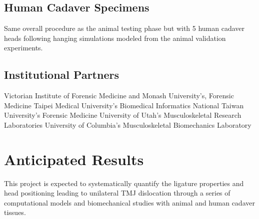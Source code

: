 \documentclass{article}
\begin{document}
%
\subsection{Human Cadaver Specimens} 

Same overall procedure as the animal testing phase but with 5 human cadaver heads following hanging simulations modeled from the animal validation experiments.

%
\subsection{Institutional Partners}

\begin{outline}



\1 Victorian Institute of Forensic Medicine and Monash University's, Forensic Medicine
\1 Taipei Medical University's Biomedical Informatics
\1 National Taiwan University's Forensic Medicine
\1 University of Utah’s Musculoskeletal Research Laboratories
\1 University of Columbia’s Musculoskeletal Biomechanics Laboratory


\end{outline}

%


\section{Anticipated Results}

This project is expected to systematically quantify the ligature properties and head positioning leading to unilateral TMJ dislocation through a series of computational models and biomechanical studies with animal and human cadaver tissues. 
\end{document}
